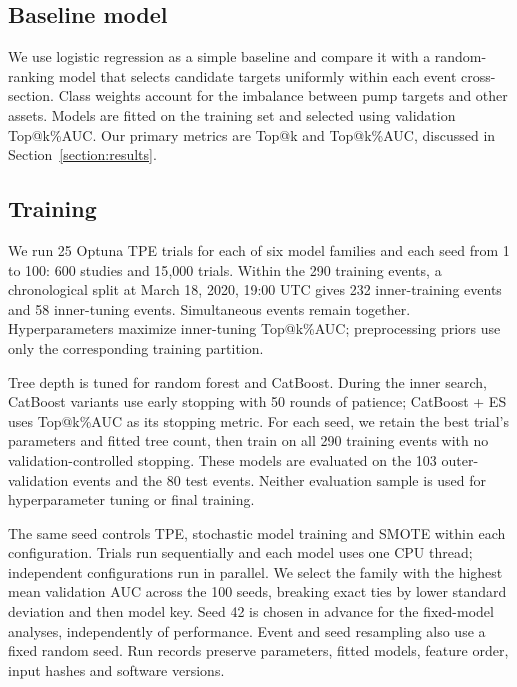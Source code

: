 \documentclass{ieeeaccess}
\begin{document}
\subsection{Baseline model}

We use logistic regression as a simple baseline and compare it with a random-ranking model that selects candidate targets uniformly within each event cross-section. \textcolor{revisionblue}{Class weights account for} the \textcolor{revisionblue}{imbalance between pump targets and other assets. Models are fitted on the training} set \textcolor{revisionblue}{and selected} using \textcolor{revisionblue}{validation} Top@k\%AUC. \textcolor{revisionblue}{Our primary} metrics are \textcolor{revisionblue}{Top@k and Top@k\%AUC, discussed} in \textcolor{revisionblue}{Section~}\ref{section:results}.

\subsection{Training}
\textcolor{revisionblue}{We run 25 Optuna TPE trials for each of six model families and each seed from 1 to 100: 600 studies and 15{,}000 trials. Within the 290 training events, a chronological split at March 18, 2020, 19:00 UTC gives 232 inner-training events and 58 inner-tuning events. Simultaneous events remain together. Hyperparameters maximize inner-tuning Top@k\%AUC; preprocessing priors use only the corresponding training partition.}

\textcolor{revisionblue}{Tree depth is tuned for random forest and CatBoost. During the inner search, CatBoost variants use early stopping with 50 rounds of patience; CatBoost + ES uses Top@k\%AUC as its stopping metric. For each seed, we retain the best trial's parameters and fitted tree count, then train on all 290 training events with no validation-controlled stopping. These models are evaluated on the 103 outer-validation events and the 80 test events. Neither evaluation sample is used for hyperparameter tuning or final training.}

\textcolor{revisionblue}{The same seed controls TPE, stochastic model training and SMOTE within each configuration. Trials run sequentially and each model uses one CPU thread; independent configurations run in parallel. We select the family with the highest mean validation AUC across the 100 seeds, breaking exact ties by lower standard deviation and then model key. Seed 42 is chosen in advance for the fixed-model analyses, independently of performance. Event and seed resampling also use a fixed random seed. Run records preserve parameters, fitted models, feature order, input hashes and software versions.}
\end{document}
